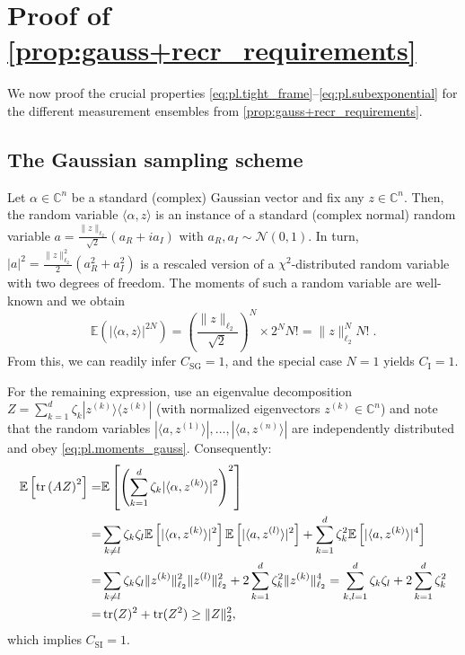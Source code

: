 \section{Proof of \cref{prop:gauss+recr_requirements}}
\label{sec:pl.gauss+recr_requirements}

We now proof the crucial properties \eqref{eq:pl.tight_frame}--\eqref{eq:pl.subexponential} for the different measurement ensembles from \cref{prop:gauss+recr_requirements}.

\subsection{The Gaussian sampling scheme}


Let $\alpha \in \mathbb{C}^n$ be a standard (complex) Gaussian vector and fix any $ z \in \mathbb{C}^n$.
Then, the random variable $\langle \alpha, z \rangle$ is an instance of a standard (complex normal) random variable $a = \tfrac{\|  z \|_{\ell_2}}{\sqrt{2}} \left(a_R + i a_I\right)$ with $a_R, a_I \sim \mathcal{N}(0,1)$.
In turn, $|a|^2 = \frac{\|  z \|_{\ell_2}^2}{2} (a_R^2 + a_I^2)$ is a rescaled version of a $\chi^2$-distributed random variable with two degrees of freedom.
The moments of such a random variable are well-known and we obtain
\[
  \mathbb{E} (| \langle \alpha, z \rangle|^{2N})= \left( \frac{ \|  z \|_{\ell_2}}{\sqrt{2}}\right)^N \times 2^N N! = \|  z \|_{\ell_2}^N N! \; .\label{eq:pl.moments_gauss}
\]
From this, we can readily infer $C_\mathrm{SG} = 1$, and the special case $N=1$  yields $C_\mathrm{I}=1$.

For the remaining expression, use an eigenvalue decomposition $ Z = \sum_{k=1}^d \zeta_k | z^{(k)} \rangle \langle  z^{(k)}|$ (with normalized eigenvectors $ z^{(k)}\in \mathbb{C}^n$) and note that the random variables $|\langle  a, z^{(1)} \rangle|,\ldots, | \langle  a, z^{(n)} \rangle|$ are independently distributed and obey \cref{eq:pl.moments_gauss}.
Consequently:
\begin{align}
  \mathbb{E} \left[ \operatorname{tr} \left(  A  Z \right)^2 \right]
  =& \mathbb{E} \left[ \left( \sum_{k=1}^d \zeta_k | \langle \alpha, z^{(k)} \rangle|^2 \right)^2 \right] \\
  =& \sum_{k \neq l} \zeta_k \zeta_l \mathbb{E} \left[ |\langle \alpha, z^{(k)} \rangle|^2 \right] \mathbb{E} \left[ | \langle  a, z^{(l)} \rangle|^2 \right]
  + \sum_{k=1}^d \zeta_k^2 \mathbb{E} \left[ | \langle  a,  z^{(k)} \rangle|^4 \right] \\
  =& \sum_{k \neq l} \zeta_k \zeta_l \| z^{(k)} \|_{\ell_2}^2 \|  z^{(l)} \|_{\ell_2}^2 + 2 \sum_{k=1}^d \zeta_k^2 \|  z^{(k)} \|_{\ell_2}^4
  = \sum_{k,l=1}^d \zeta_k \zeta_l + 2\sum_{k=1}^d \zeta_k^2 \\
  =& \operatorname{tr} ( Z)^2 + \operatorname{tr} ( Z^2)
  \geq \|  Z \|_2^2,
\end{align}
which implies $C_\mathrm{SI} = 1$.

